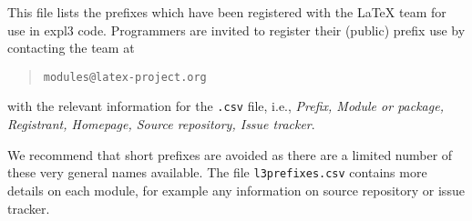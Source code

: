 \documentclass{article}
\begin{document}
This file lists the prefixes which have been registered with the \LaTeX{}
team for use in \textsf{expl3} code. Programmers are invited to register their
(public) prefix use by contacting the team at
\begin{quote}
  \texttt{modules@latex-project.org}
\end{quote}
with the relevant information for the \texttt{.csv} file, i.e.,
\textit{Prefix, Module or package, Registrant, Homepage, Source repository, Issue tracker}.


We recommend that short prefixes are avoided as there are a limited
number of these very general names available.  The
file \texttt{l3prefixes.csv} contains more details on each module, for
example any information on source repository or issue tracker.

\PrintTable
\end{document}
